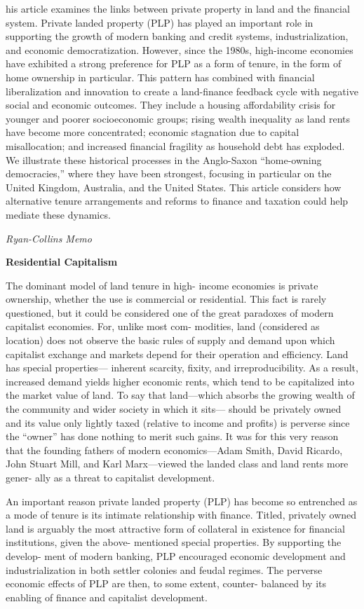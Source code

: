 \documentclass[
]{book}
\begin{document}
his article examines the links between private property in land and the financial system. Private landed property (PLP) has played an important role in supporting the growth of modern banking and credit systems, industrialization, and economic democratization. However, since the 1980s, high-income economies have exhibited a strong preference for PLP as a form of tenure, in the form of home ownership in particular. This pattern has combined with financial liberalization and innovation to create a land-finance feedback cycle with negative social and economic outcomes. They include a housing affordability crisis for younger and poorer socioeconomic groups; rising wealth inequality as land rents have become more concentrated; economic stagnation due to capital misallocation; and increased financial fragility as household debt has exploded. We illustrate these historical processes in the Anglo-Saxon ``home-owning democracies,'' where they have been strongest, focusing in particular on the United Kingdom, Australia, and the United States. This article considers how alternative tenure arrangements and reforms to finance and taxation could help mediate these dynamics.

\emph{Ryan-Collins Memo}

\textbf{Residential Capitalism}

The dominant model of land tenure in high-­
income economies is
private ownership, whether the use is commercial or residential. This
fact is rarely questioned, but it could be considered one of the great
paradoxes of modern capitalist economies. For, unlike most com-
modities, land (considered as location) does not observe the basic
rules of supply and demand upon which capitalist exchange and
markets depend for their operation and efficiency. Land has special
properties---­
inherent scarcity, fixity, and irreproducibility.
As a result, increased demand yields higher economic rents,
which tend to be capitalized into the market value of land.
To say that land---­which absorbs the
growing wealth of the community and wider society in which it sits---­
should be privately owned and its value only lightly taxed (relative to
income and profits) is perverse since the ``owner'' has done nothing to
merit such gains. It was for this very reason that the founding fathers
of modern economics---­Adam Smith, David Ricardo, John Stuart Mill,
and Karl Marx---­viewed the landed class and land rents more gener-
ally as a threat to capitalist development.

An important reason private landed property (PLP) has become
so entrenched as a mode of tenure is its intimate relationship with
finance. Titled, privately owned land is arguably the most attractive
form of collateral in existence for financial institutions, given the
above-­
mentioned special properties. By supporting the develop-
ment of modern banking, PLP encouraged economic development
and industrialization in both settler colonies and feudal regimes. The
perverse economic effects of PLP are then, to some extent, counter-­
balanced by its enabling of finance and capitalist development.
\end{document}
